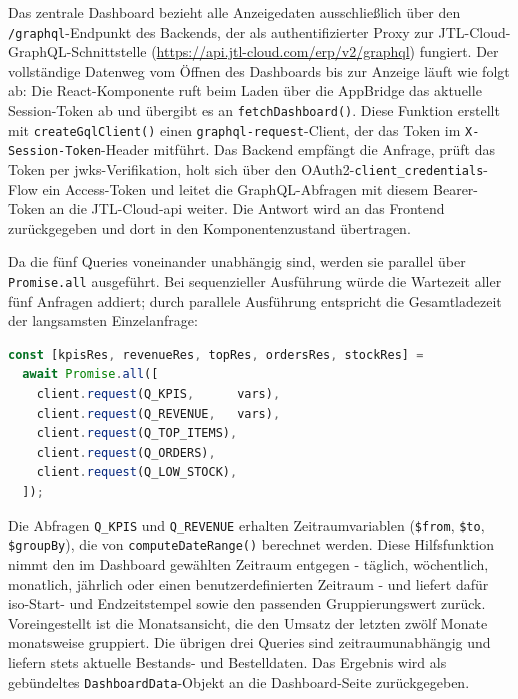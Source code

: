 \documentclass[11pt, a4paper, oneside]{report}
\begin{document}
Das zentrale Dashboard bezieht alle Anzeigedaten ausschließlich über den
\texttt{/graphql}-Endpunkt des Backends, der als authentifizierter Proxy zur
JTL-Cloud-GraphQL-Schnittstelle
(\url{https://api.jtl-cloud.com/erp/v2/graphql}) fungiert.
Der vollständige Datenweg vom Öffnen des Dashboards bis zur Anzeige läuft
wie folgt ab: Die React-Komponente ruft beim Laden über die AppBridge das
aktuelle Session-Token ab und übergibt es an \texttt{fetchDashboard()}.
Diese Funktion erstellt mit \texttt{createGqlClient()} einen
\texttt{graphql-request}-Client, der das Token im \texttt{X-Session-Token}-Header
mitführt. Das Backend empfängt die Anfrage, prüft das Token per
\gls{jwks}-Verifikation, holt sich über den OAuth2-\texttt{client\_credentials}-Flow
ein Access-Token und leitet die GraphQL-Abfragen mit diesem Bearer-Token an
die JTL-Cloud-\gls{api} weiter. Die Antwort wird an das Frontend
zurückgegeben und dort in den Komponentenzustand übertragen.

Da die fünf Queries voneinander unabhängig sind, werden sie parallel über
\texttt{Promise.all} ausgeführt. Bei sequenzieller Ausführung würde die
Wartezeit aller fünf Anfragen addiert; durch parallele Ausführung entspricht
die Gesamtladezeit der langsamsten Einzelanfrage:

\begin{lstlisting}[language=JavaScript,
  caption={Paralleler GraphQL-Datenabruf (api.ts, Auszug)},
  label=lst:graphql]
const [kpisRes, revenueRes, topRes, ordersRes, stockRes] =
  await Promise.all([
    client.request(Q_KPIS,      vars),
    client.request(Q_REVENUE,   vars),
    client.request(Q_TOP_ITEMS),
    client.request(Q_ORDERS),
    client.request(Q_LOW_STOCK),
  ]);
\end{lstlisting}

Die Abfragen \texttt{Q\_KPIS} und \texttt{Q\_REVENUE} erhalten Zeitraumvariablen
(\texttt{\$from}, \texttt{\$to}, \texttt{\$groupBy}), die von
\texttt{computeDateRange()} berechnet werden. Diese Hilfsfunktion nimmt den im
Dashboard gewählten Zeitraum entgegen - täglich, wöchentlich, monatlich, jährlich
oder einen benutzerdefinierten Zeitraum - und liefert dafür \gls{iso}-Start- und
Endzeitstempel sowie den passenden Gruppierungswert zurück. Voreingestellt ist die
Monatsansicht, die den Umsatz der letzten zwölf Monate monatsweise gruppiert. Die
übrigen drei Queries sind zeitraumunabhängig und liefern stets aktuelle Bestands-
und Bestelldaten. Das Ergebnis wird als gebündeltes \texttt{DashboardData}-Objekt
an die Dashboard-Seite zurückgegeben.
\end{document}

